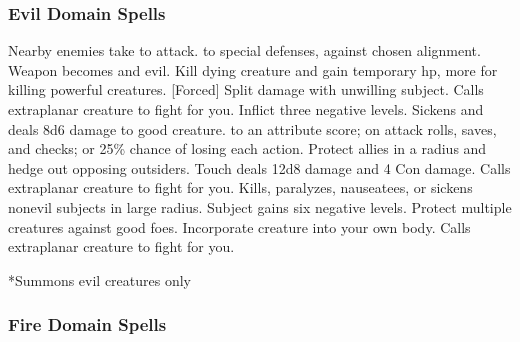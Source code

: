 \subsubsection{Evil Domain Spells}

\begin{spelllist}
     Nearby enemies take  to attack.
      to special defenses,  against chosen alignment.
     Weapon becomes  and evil.
     Kill dying creature and gain temporary hp, more for killing powerful creatures.
    [Forced] Split damage with unwilling subject.
     Calls extraplanar creature to fight for you.
     Inflict three negative levels.
     Sickens and deals 8d6 damage to good creature.
      to an attribute score;  on attack rolls, saves, and checks; or 25\% chance of losing each action.
     Protect allies in a \areamed radius and hedge out opposing outsiders.
     Touch deals 12d8 damage and 4 Con damage.
     Calls extraplanar creature to fight for you.
     Kills, paralyzes, nauseatees, or sickens nonevil subjects in large radius.
    \spellhead[7]{}
     Subject gains six negative levels.
    \F Protect multiple creatures against good foes. 
     Incorporate creature into your own body.
     Calls extraplanar creature to fight for you.
\end{spelllist}
*Summons evil creatures only

\subsubsection{Fire Domain Spells}


